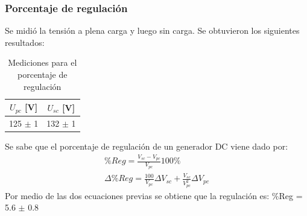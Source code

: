 \documentclass[11pt,letterpaper]{article}     %
\begin{document}
\subsubsection{Porcentaje de regulación}
Se midió la tensión a plena carga y luego sin carga. Se obtuvieron los siguientes resultados:
\begin{table}[H]
	\centering
	\caption{Mediciones para el porcentaje de regulación}
	\label{MedPReg}
	\begin{tabular}{|c|c|}
		\hline
		\textbf{$U_{pc}$ {[}V{]}} & \textbf{$U_{sc}$ {[}V{]}} \\ \hline
		125 $\pm$ 1               & 132 $\pm$ 1               \\ \hline
	\end{tabular}
\end{table}
Se sabe que el porcentaje de regulación de un generador DC viene dado por:
\begin{align}
	\%Reg = \frac{V_{sc}-V_{pc}}{V_{pc}}100\%\\
	\Delta \%Reg = \frac{100}{V_{pc}}\Delta V_{sc} + \frac{V_{sc}}{V_ {pc}^{2}}\Delta V_{pc}
\end{align}
Por medio de las dos ecuaciones previas se obtiene que la regulación es: \%Reg = 5.6 $\pm$ 0.8
\end{document}

